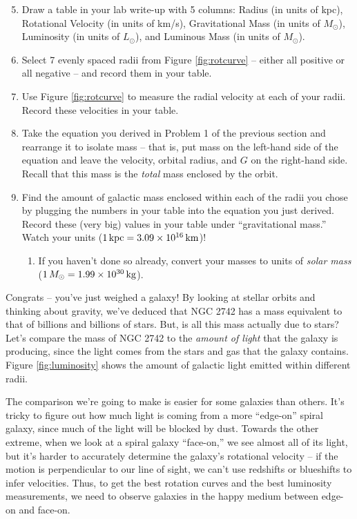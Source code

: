 \documentclass[11pt]{article}%
\begin{document}
\begin{enumerate}
\setcounter{enumi}{4}

\item Draw a table in your lab write-up with 5 columns: Radius (in units of kpc), Rotational Velocity (in units of km/s), Gravitational Mass (in units of $M_{\odot}$), Luminosity (in units of $L_{\odot}$), and Luminous Mass (in units of $M_{\odot}$).

\item Select 7 evenly spaced radii from Figure \ref{fig:rotcurve} -- either all positive or all negative -- and record them in your table.

\item Use Figure \ref{fig:rotcurve} to measure the radial velocity at each of your radii. Record these velocities in your table.

\item Take the equation you derived in Problem 1 of the previous section and rearrange it to isolate mass -- that is, put mass on the left-hand side of the equation and leave the velocity, orbital radius, and $G$ on the right-hand side. Recall that this mass is the \emph{total} mass enclosed by the orbit.

\item Find the amount of galactic mass enclosed within each of the radii you chose by plugging the numbers in your table into the equation you just derived. Record these (very big) values in your table under ``gravitational mass.'' Watch your units ($1 \, {\rm kpc} = 3.09 \times 10^{16} \, {\rm km}$)! 
\begin{enumerate}
    \item If you haven't done so already, convert your masses to units of \emph{solar mass} ($1 \, M_\odot = 1.99 \times 10^{30} \, {\rm kg}$).
\end{enumerate} 
\end{enumerate}

\noindent
Congrats -- you've just weighed a galaxy! By looking at stellar orbits and thinking about gravity, we've deduced that NGC 2742 has a mass equivalent to that of billions and billions of stars. But, is all this mass actually due to stars? Let's compare the mass of NGC 2742 to the \emph{amount of light} that the galaxy is producing, since the light comes from the stars and gas that the galaxy contains.  Figure \ref{fig:luminosity} shows the amount of galactic light emitted within different radii. 

\medskip \noindent
The comparison we're going to make is easier for some galaxies than others. It's tricky to figure out how much light is coming from a more ``edge-on'' spiral galaxy, since much of the light will be blocked by dust. Towards the other extreme, when we look at a spiral galaxy ``face-on,'' we see almost all of its light, but it's harder to accurately determine the galaxy's rotational velocity -- if the motion is perpendicular to our line of sight, we can't use redshifts or blueshifts to infer velocities. Thus, to get the best rotation curves and the best luminosity measurements, we need to observe galaxies in the happy medium between edge-on and face-on.
\end{document}
